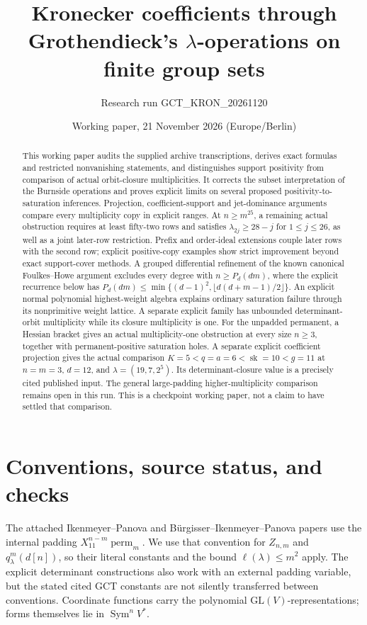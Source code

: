 \documentclass[11pt]{article}
\title{Kronecker coefficients through Grothendieck's\linebreak
\(\lambda\)-operations on finite group sets}
\author{Research run GCT\_KRON\_20261120}
\date{Working paper, 21 November 2026 (Europe/Berlin)}
\begin{document}
\maketitle
\begin{abstract}
This working paper audits the supplied archive transcriptions, derives
exact formulas and restricted nonvanishing statements, and distinguishes
support positivity from comparison of actual orbit-closure multiplicities.
It corrects the subset interpretation of the Burnside operations and proves
explicit limits on several proposed positivity-to-saturation inferences.
Projection, coefficient-support and jet-dominance arguments compare every
multiplicity copy in explicit ranges. At \(n\geq m^{25}\), a remaining
actual obstruction requires at least fifty-two rows and satisfies
\(\lambda_{2j}\geq28-j\) for \(1\leq j\leq26\), as well as a
joint later-row restriction. Prefix and order-ideal extensions couple
later rows with the second row; explicit positive-copy examples show
strict improvement beyond exact support-cover methods. A grouped differential refinement of the
known canonical Foulkes--Howe argument excludes every degree with
\(n\geq P_d(dm)\), where the explicit recurrence below has
\(P_d(dm)\leq\min\{(d-1)^2,\lfloor d(d+m-1)/2\rfloor\}\).
An explicit normal polynomial highest-weight algebra explains ordinary
saturation failure through its nonprimitive weight lattice. A separate
explicit family has unbounded determinant-orbit multiplicity while its
closure multiplicity is one. For the unpadded permanent, a Hessian
bracket gives an actual multiplicity-one obstruction at every size
\(n\geq3\), together with permanent-positive saturation holes.
A separate explicit coefficient projection gives the actual comparison
\(K=5<q=a=6<\operatorname{sk}=10<g=11\) at
\(n=m=3\), \(d=12\), and \(\lambda=(19,7,2^5)\).
Its determinant-closure value is a precisely cited published input.
The general large-padding
higher-multiplicity comparison remains open in this run. This is a
checkpoint working paper, not a claim to have settled that comparison.
\end{abstract}

\section*{Conventions, source status, and checks}
The attached Ikenmeyer--Panova and B\"urgisser--Ikenmeyer--Panova papers
use the internal padding \(X_{11}^{n-m}\operatorname{perm}_m\).
We use that convention for \(Z_{n,m}\) and \(q^m_\lambda(d[n])\),
so their literal constants and the bound \(\ell(\lambda)\leq m^2\)
apply. The explicit determinant constructions also work with an external
padding variable, but the stated cited GCT constants are not silently
transferred between conventions. Coordinate functions carry the polynomial
\(\mathrm{GL}(V)\)-representations; forms themselves lie in
\(\operatorname{Sym}^n V^*\).
\end{document}
